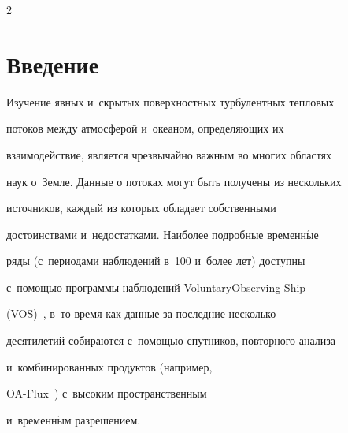 















\thispagestyle{headings}





\begin{multicols}{2}





\label{st\stat}





\section{Введение}





Изучение явных и~скрытых поверхностных турбулентных тепловых


потоков между атмосферой и~океаном, определяющих их


взаимодействие, является чрезвычайно важным во многих областях


наук о~Земле. Данные о потоках могут быть получены из нескольких


источников, каждый из которых обладает собственными


достоинствами и~недостатками. Наиболее подробные временн$\acute{\mbox{ы}}$е


ряды (с~периодами  наблюдений в~100 и~более лет)  доступны\linebreak 


с~по\-мощью программы наблюдений Voluntary\linebreak Observing Ship


(VOS)~\cite{Berry2009}, в~то время как данные за последние несколько


десятилетий собираются с~помощью спутников, повторного анализа 


и~комбинированных продуктов (например,


OA-Flux~\cite{Yu2007a,Yu2007b}) с~высоким пространственным 


и~временн$\acute{\mbox{ы}}$м разрешением.






\end{multicols}

